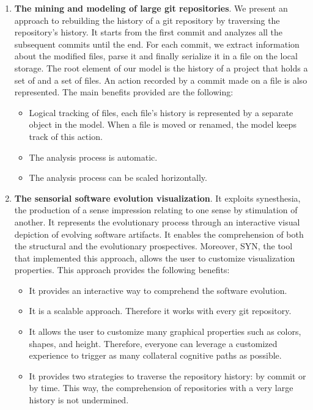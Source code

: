 \begin{enumerate}
    \item \textbf{The mining and modeling of large git repositories}. We present an approach to rebuilding the history of a git repository by traversing the repository's history. It starts from the first commit and analyzes all the subsequent commits until the end.
    For each commit, we extract information about the modified files, parse it and finally serialize it in a file on the local storage. The root element of our model is the history of a project that holds a set of and a set of files. An action recorded by a commit made on a file is also represented. The main benefits provided are the following: \begin{itemize}
        \item Logical tracking of files, each file's history is represented by a separate object in the model. When a file is moved or renamed, the model keeps track of this action. 
        \item The analysis process is automatic. 
        \item The analysis process can be scaled horizontally. 
    \end{itemize}
    \item \textbf{The sensorial software evolution visualization}. It exploits synesthesia, the production of a sense impression relating to one sense by stimulation of another. It represents the evolutionary process through an interactive visual depiction of evolving software artifacts. It enables the comprehension of both the structural and the evolutionary prospectives. Moreover, SYN, the tool that implemented this approach, allows the user to customize visualization properties. This approach provides the following benefits:
    \begin{itemize}
        \item It provides an interactive way to comprehend the software evolution.
        \item It is a scalable approach. Therefore it works with every git repository. 
        \item It allows the user to customize many graphical properties such as colors, shapes, and height. Therefore, everyone can leverage a customized experience to trigger as many collateral cognitive paths as possible. 
        \item It provides two strategies to traverse the repository history: by commit or by time. This way, the comprehension of repositories with a very large history is not undermined. 

\end{itemize}
\end{enumerate}
